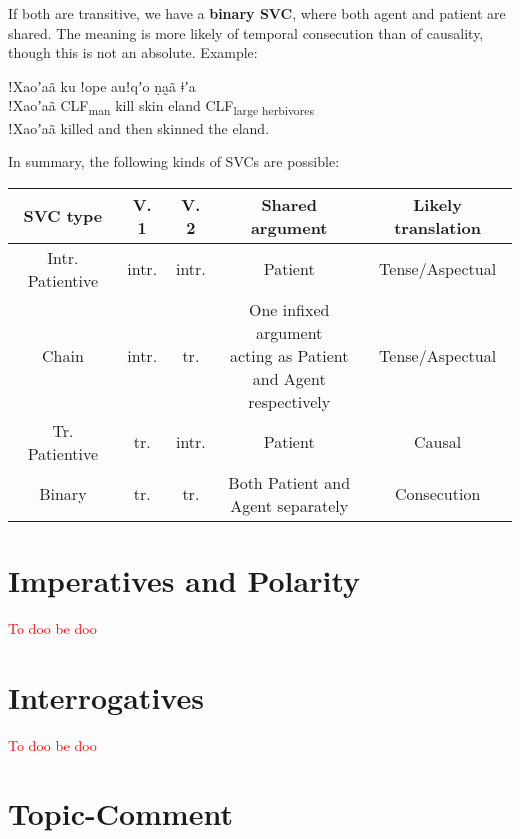\documentclass[11pt,a5paper]{book}
\newcommand{\grammsc}[1]{\textsc{#1}}
\newcommand{\CLF}[1]{\grammsc{CLF}\textsubscript{#1}}
\newcommand{\cmnt}[1]{\textcolor{red}{#1}}
\begin{document}
If both are transitive, we have a \textbf{binary SVC}, where both agent and patient are shared. The meaning is more likely of temporal consecution than of causality, though this is not an absolute. Example:

\begin{exe}
\ex
\gll ǃXaoʼaã ku ǃope auǃqʼo ṇa̰ã ǂʼa\\
ǃXaoʼaã \CLF{man} kill skin eland \CLF{large herbivores}\\
\glt ǃXaoʼaã killed and then skinned the eland.
\end{exe}

In summary, the following kinds of SVCs are possible:

\begin{center}
\renewcommand{\arraystretch}{2}
\setlength\tabcolsep{1.3pt}
\begin{tabular}{ccccc}
\hline
\textbf{SVC type} & \textbf{V. 1} & \textbf{V. 2} & \textbf{Shared argument} & \textbf{Likely translation}\\\hline \hline
Intr. Patientive & intr. & intr. & Patient & Tense/Aspectual \\ \hline
Chain & intr. & tr. &\makecell{One infixed argument\\ acting as Patient\\and Agent respectively} & Tense/Aspectual \\\hline
Tr. Patientive & tr. & intr. & Patient & Causal \\\hline
Binary & tr. & tr. & \makecell{Both Patient and\\Agent separately} & Consecution \\  \hline
\end{tabular}
\end{center}

\section{Imperatives and Polarity}

\cmnt{To doo be doo}

\section{Interrogatives}

\cmnt{To doo be doo}

\section{Topic-Comment}\label{sec:topiccomment}
\end{document}
